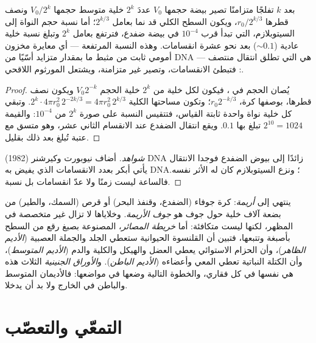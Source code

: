 \begin{theorem}\label{thm:b2:vertebrate-development:cleavage}
بعد $k$ تفلجًا متزامنًا تصير بيضة حجمها $V_0$ عددَ $2^{k}$
خلية متوسط حجمها $V_0/2^{k}$ ونصف قطرها $r_0/2^{k/3}$، ويكون
السطح الكلي قد نما بعامل $2^{k/3}$؛ أما نسبة حجم النواة إلى
السيتوبلازم، التي تبدأ قرب $10^{-4}$ في بيضة ضفدع، فترتفع
بعامل $2^{k}$ وتبلغ نسبة خلية عادية ($\sim 0.1$) بعد
نحو عشرة انقسامات. وهذه النسبة المرتفعة --- أي معايرة
مخزون أمومي ثابت من مثبط ما بمقدار متزايد أسّيًا
من DNA --- هي التي تطلق انتقال منتصف :
فتبطئ الانقسامات، وتصير غير متزامنة، ويشتعل المورثوم
اللاقحي.
\end{theorem}
\begin{proof}
يُصان الحجم في ، فيكون لكل خلية من $2^{k}$ خلية الحجم $V_0
2^{-k}$ ويكون نصف قطرها، بوصفها كرة، $r_0 2^{-k/3}$؛ وتكون مساحتها
الكلية $2^{k}\cdot 4\pi r_0^{2}\, 2^{-2k/3} = 4\pi r_0^{2}\, 2^{k/3}$. وتبقي كل
خلية نواة واحدة ثابتة القياس، فتتقيس النسبة على صورة $2^{k}$
من $10^{-4}$: والقيمة $2^{10} = 1024$ تبلغ بها $0.1$. ويقع انتقال
الضفدع عند الانقسام الثاني عشر، وهو متسق مع
عتبة تُبلغ بعد ذلك بقليل.
\end{proof}
\begin{proof}[شواهد]
أضاف نيوبورت وكيرشنر (1982) DNA زائدًا إلى بيوض الضفدع
فوجدا الانتقال يأتي أبكر بعدد الانقسامات الذي يفيض به DNA؛
ونزع السيتوبلازم كان له الأثر نفسه. فالساعة ليست
زمنًا ولا عدّ انقسامات بل نسبة.
\end{proof}

\begin{definition}[الأريمة]\label{def:b2:vertebrate-development:blastula}
ينتهي  إلى \emph{أريمة}: كرة جوفاء (الضفدع، وقنفذ البحر)
أو قرص (السمك، والطير) من بضعة آلاف خلية حول جوف هو
\emph{جوف الأريمة}. وخلاياها لا تزال غير متخصصة في المظهر،
لكنها ليست متكافئة: أما \emph{خريطة المصائر}، المصنوعة بصبغ
رقع من السطح بأصبغة وتتبعها، فتبين أن القلنسوة
الحيوانية ستعطي الجلد والجملة العصبية (\emph{الأديم الظاهر})،
وأن الحزام الاستوائي يعطي العضل والهيكل والكلية والدم
(\emph{الأديم المتوسط})، وأن الكتلة النباتية تعطي المعي وأعضاءه
(\emph{الأديم الباطن}). و\emph{الأوراق الجنينية} الثلاث هذه هي
نفسها في كل فقاري، والخطوة التالية وضعها في مواضعها:
فالأديمان المتوسط والباطن في الخارج ولا بد أن يدخلا.
\end{definition}

\section{التمعّي والتعصّب}

